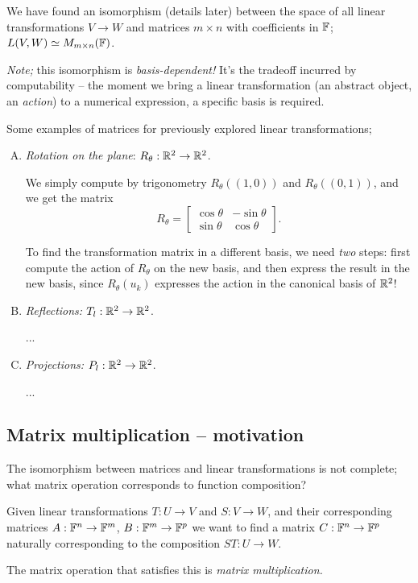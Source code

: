 We have found an isomorphism (details later) between the space of all linear transformations $V\to W$ and matrices $m\times n$ with coefficients in $\mathbb{F}$; $L(V,W)\simeq M_{m\times n}(\mathbb{F})$.

\emph{Note;} this isomorphism is \emph{basis-dependent!} It's the tradeoff incurred by computability -- the moment we bring a linear transformation (an abstract object, an \emph{action}) to a numerical expression, a specific basis is required.

Some examples of matrices for previously explored linear transformations;
\begin{enumerate}[(A)]
  \item \emph{Rotation on the plane}: $R_\theta:\mathbb{R}^2\to\mathbb{R}^2$.

  We simply compute by trigonometry $R_\theta((1,0))$ and $R_\theta((0,1))$, and we get the matrix
  \[R_\theta = \begin{bmatrix}
    \cos\theta & -\sin\theta\\
    \sin\theta & \cos\theta
  \end{bmatrix}.\]

  To find the transformation matrix in a different basis, we need \emph{two} steps: first compute the action of $R_\theta$ on the new basis, and then express the result in the new basis, since $R_\theta(u_k)$ expresses the action in the canonical basis of $\mathbb{R}^2$!

  \item \emph{Reflections:} $T_l:\mathbb{R}^2\to\mathbb{R}^2$.

  ...

  \item \emph{Projections:} $P_l:\mathbb{R}^2\to\mathbb{R}^2$.

  ...
\end{enumerate}

\subsection{Matrix multiplication -- motivation}

The isomorphism between matrices and linear transformations is not complete; what matrix operation corresponds to function composition?

Given linear transformations $T:U\to V$ and $S:V\to W$, and their corresponding matrices $A:\mathbb{F}^n\to\mathbb{F}^m$, $B:\mathbb{F}^m\to\mathbb{F}^p$ we want to find a matrix $C:\mathbb{F}^n\to\mathbb{F}^p$ naturally corresponding to the composition $ST:U\to W$.

The matrix operation that satisfies this is \emph{matrix multiplication.}
